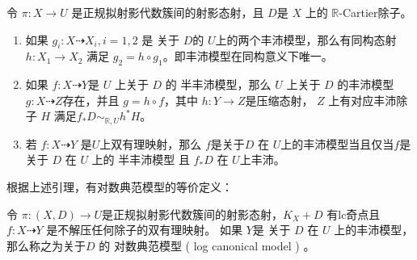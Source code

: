 \begin{lemma}\cite[Lemma 3.6.6]{BCHM10}
  令 $\pi:X \to U$ 是正规拟射影代数簇间的射影态射，且 $D$是 $X$ 上的 $\mathbb{R}$-Cartier除子。

  \begin{enumerate}
    \item 如果 $g_{i}:X \dashrightarrow X_{i}, i=1,2$ 是 关于 $D$的  $U$上的两个丰沛模型，那么有同构态射 $h:X_{1}\to X_{2}$ 满足 $g_{2}=h \circ g_{1}$。即丰沛模型在同构意义下唯一。
    \item 如果 $f:X \dashrightarrow Y$是 $U$ 上关于 $D$ 的 半丰沛模型，那么 $U$ 上关于 $D$ 的丰沛模型 $g:X \dashrightarrow  Z$存在，并且 $g=h \circ f$，其中 $h:Y \to Z$是压缩态射， $Z$ 上有对应丰沛除子 $H$  满足$f_*D \sim_{\mathbb{R},U}h^*H$。
    \item  若 $f:X \dashrightarrow Y$  是$U$上双有理映射，那么 $f$是关于$D$ 在 $U$上的丰沛模型当且仅当$f$是关于 $D$ 在 $U$ 上的  半丰沛模型 且 $f_*D$ 在 $U$上丰沛。
  \end{enumerate}
\end{lemma}
根据上述引理，有对数典范模型的等价定义：

\begin{definition}
  令 $ \pi:(X, D)\to U $是正规拟射影代数簇间的射影态射，$ K_X+D $ 有lc奇点且$ f: X\dashrightarrow Y $ 是不解压任何除子的双有理映射。 如果 $ Y $是 关于 $D$ 在 $U$ 上的丰沛模型，那么称之为关于$D$ 的 对数典范模型 ( log canonical model ) 。
\end{definition}

